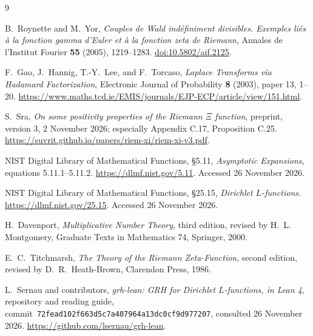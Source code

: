 \documentclass[11pt]{article}
\theoremstyle{remark}\newtheorem{remark}[theorem]{Remark}
\begin{document}
\begin{thebibliography}{9}

B.~Roynette and M.~Yor,
\emph{Couples de Wald ind\'efiniment divisibles. Exemples li\'es \`a la
fonction gamma d'Euler et \`a la fonction zeta de Riemann},
Annales de l'Institut Fourier \textbf{55} (2005), 1219--1283.
\href{https://doi.org/10.5802/aif.2125}{doi:10.5802/aif.2125}.

F.~Gao, J.~Hannig, T.-Y.~Lee, and F.~Torcaso,
\emph{Laplace Transforms via Hadamard Factorization},
Electronic Journal of Probability \textbf{8} (2003), paper 13, 1--20.
\url{https://www.maths.tcd.ie/EMIS/journals/EJP-ECP/article/view/151.html}.

S.~Sra,
\emph{On some positivity properties of the Riemann $\Xi$ function},
preprint, version 3, 2 November 2026; especially Appendix C.17,
Proposition C.25.
\url{https://suvrit.github.io/papers/riem-xi/riem-xi-v3.pdf}.

NIST Digital Library of Mathematical Functions,
\S5.11, \emph{Asymptotic Expansions}, equations 5.11.1--5.11.2.
\url{https://dlmf.nist.gov/5.11}. Accessed 26 November 2026.

NIST Digital Library of Mathematical Functions,
\S25.15, \emph{Dirichlet $L$-functions}.
\url{https://dlmf.nist.gov/25.15}. Accessed 26 November 2026.

H.~Davenport,
\emph{Multiplicative Number Theory}, third edition, revised by H.~L.
Montgomery, Graduate Texts in Mathematics 74, Springer, 2000.

E.~C.~Titchmarsh,
\emph{The Theory of the Riemann Zeta-Function}, second edition, revised by
D.~R.~Heath-Brown, Clarendon Press, 1986.

L.~Sernau and contributors,
\emph{grh-lean: GRH for Dirichlet $L$-functions, in Lean 4},
repository and reading guide, commit\
\texttt{72fead102f663d5c7a407964a13dc0cf9d977207},
consulted 26 November 2026.
\url{https://github.com/lsernau/grh-lean}.

\end{thebibliography}
\end{document}
